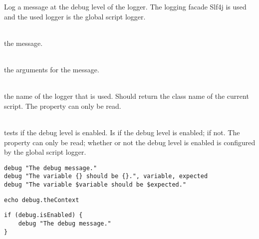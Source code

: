 %


Log a message at the debug level of the logger.
The logging facade Slf4j\cite{slf4j13} is used and the used logger is
the global script logger.

\begin{asparadesc}
%
\item[\code{message}] \hfill \\
the message.
%
\item[\code{arguments...}] \hfill \\
the arguments for the message.
%
\item[\code{theContext}] \hfill \\
the name of the logger that is used. Should return the class name of the current
script. The property can only be read.
%
\item[\code{isEnabled}] \hfill \\
tests if the debug level is enabled. Is  if the debug level is enabled;
 if not. The property can only be read; whether or not the debug
level is enabled is configured by the global script logger.
%
\end{asparadesc}

\begin{lstlisting}[style=Groovybash, label={lst:example_debug1}, title={%
Outputs a debug logging message with arguments.}]
debug "The debug message."
debug "The variable {} should be {}.", variable, expected
debug "The variable $variable should be $expected."
\end{lstlisting}

\begin{lstlisting}[style=Groovybash, label={lst:example_debug2}, title={%
Prints the name of the current logger.}]
echo debug.theContext
\end{lstlisting}

\begin{lstlisting}[style=Groovybash, label={lst:example_debug3}, title={%
Tests if the debug level is enabled.}]
if (debug.isEnabled) {
    debug "The debug message."
}
\end{lstlisting}

